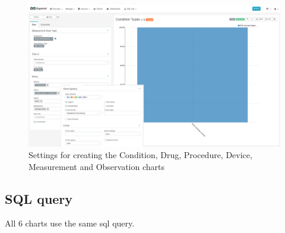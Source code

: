 \documentclass[
]{book}
\begin{document}
\begin{figure}
\includegraphics[width=1\linewidth]{images/09-provenance/02-condition_drug_procedure_device_measurement_observation_types} \caption{Settings for creating the Condition, Drug, Procedure, Device, Measurement and Observation charts}\label{fig:conditionDrugProcedureDeviceMeasurementObservationTypes}
\end{figure}

\hypertarget{sql-query-25}{%
\subsection{SQL query}\label{sql-query-25}}

All 6 charts use the same sql query.
\end{document}
